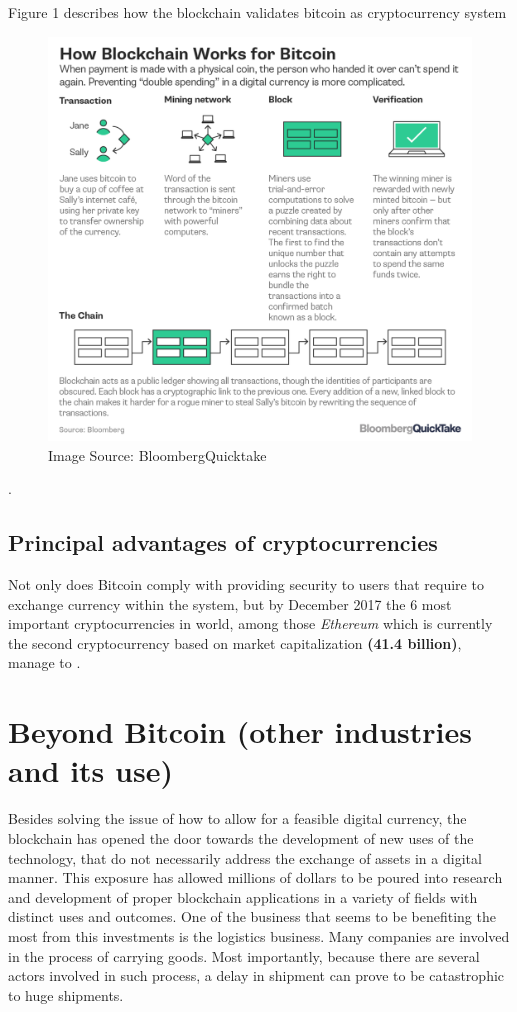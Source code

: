 \documentclass[submission,copyright,creativecommons]{eptcs}
\begin{document}
Figure 1 describes how the blockchain validates bitcoin as cryptocurrency system\cite{noauthor_bitcoin}
\begin{figure}[h]
    \centering
    \label{fig:my_label}
    \includegraphics[width=5in]{bitcoin-blockchain-bloomberg}
     \caption{Image Source: BloombergQuicktake}
\end{figure}.

\subsection{Principal advantages of cryptocurrencies}
Not only does Bitcoin comply with providing security to users that require to exchange currency within the system, but by December 2017\cite{MostImportantCryptocurrencies} the 6 most important cryptocurrencies in world, among those \textit{Ethereum} which is currently the second cryptocurrency based on market capitalization \textbf{(41.4 billion)}, manage to .

\section{Beyond Bitcoin (other industries and its use)}
Besides solving the issue of how to allow for a feasible digital currency, the blockchain has opened the door towards the development of new uses of the technology, that do not necessarily address the exchange of assets in a digital manner.  This exposure has allowed millions of dollars to be poured into research and development of proper blockchain applications in a variety of fields with distinct uses and outcomes.
One of the business that seems to be benefiting the most from this investments is the logistics business. Many companies are involved in the process of carrying goods. Most importantly, because there are several actors involved in such process, a delay in shipment can prove to be catastrophic to huge shipments.  
\end{document}
